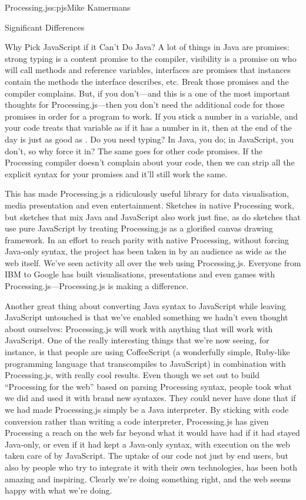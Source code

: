 \begin{aosachapter}{Processing.js}{s:pjs}{Mike Kamermans}
\begin{aosasect1}{Significant Differences}
\begin{aosasect2}{Why Pick JavaScript if it Can't Do Java?}
A lot of things in Java are promises: strong typing is a content
promise to the compiler, visibility is a promise on who will call
methods and reference variables, interfaces are promises that
instances contain the methods the interface describes, etc. Break
those promises and the compiler complains. But, if you don't---and
this is a one of the most important thoughts for Processing.js---then
you don't need the additional code for those promises in order for a
program to work. If you stick a number in a variable, and your code
treats that variable as if it has a number in it, then at the end of
the day  is just as good as . Do you need
typing? In Java, you do; in JavaScript, you don't, so why force it in?
The same goes for other code promises. If the Processing compiler
doesn't complain about your code, then we can strip all the explicit
syntax for your promises and it'll still work the same.

This has made Processing.js a ridiculously useful library for data
visualisation, media presentation and even entertainment. Sketches in
native Processing work, but sketches that mix Java and JavaScript also
work just fine, as do sketches that use pure JavaScript by treating
Processing.js as a glorified canvas drawing framework. In an effort to
reach parity with native Processing, without forcing Java-only syntax,
the project has been taken in by an audience as wide as the web
itself. We've seen activity all over the web using
Processing.js. Everyone from IBM to Google has built visualisations,
presentations and even games with Processing.js---Processing.js is
making a difference.

Another great thing about converting Java syntax to JavaScript while
leaving JavaScript untouched is that we've enabled something we
hadn't even thought about ourselves: Processing.js will work with
anything that will work with JavaScript. One of the really interesting
things that we're now seeing, for instance, is that people are using
CoffeeScript (a wonderfully simple, Ruby-like programming language
that transcompiles to JavaScript) in combination with Processing.js,
with really cool results. Even though we set out to build ``Processing
for the web'' based on parsing Processing syntax, people took what we
did and used it with brand new syntaxes. They could never have done
that if we had made Processing.js simply be a Java interpreter. By
sticking with code conversion rather than writing a code interpreter,
Processing.js has given Processing a reach on the web far beyond what
it would have had if it had stayed Java-only, or even if it had kept a
Java-only syntax, with execution on the web taken care of by
JavaScript. The uptake of our code not just by end users, but also by
people who try to integrate it with their own technologies, has been
both amazing and inspiring. Clearly we're doing something right, and
the web seems happy with what we're doing.


\end{aosasect2}
\end{aosasect1}
\end{aosachapter}
